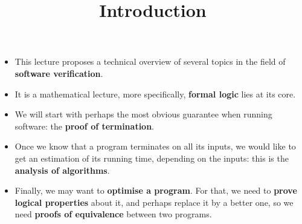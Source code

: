 \documentclass[wide]{slides}
\begin{document}
\maketitle

\begin{slide}
  \title{Introduction}

  \begin{itemize}

    \item This lecture proposes a technical overview of several topics
      in the field of \textbf{software verification}.

    \item It is a mathematical lecture, more specifically,
      \textbf{formal logic} lies at its core.

    \item We will start with perhaps the most obvious guarantee when
      running software: the \textbf{proof of termination}.

    \item Once we know that a program terminates on all its inputs, we
      would like to get an estimation of its running time, depending
      on the inputs: this is the \textbf{analysis of algorithms}.

    \item Finally, we may want to \textbf{optimise a program}. For
      that, we need to \textbf{prove logical properties} about it, and
      perhaps replace it by a better one, so we need \textbf{proofs of
        equivalence} between two programs.

  \end{itemize}

\end{slide}

\end{document}
